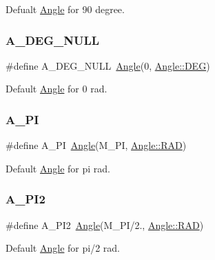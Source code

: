 Defualt \mbox{\hyperlink{class_angle}{Angle}} for 90 degree. 

\mbox{\label{maths_8hh_abc6a1d62385f5e3f01509c97666fbbbb}} 
\subsubsection{\texorpdfstring{A\_DEG\_NULL}{A\_DEG\_NULL}}
{\footnotesize\ttfamily \#define A\+\_\+\+D\+E\+G\+\_\+\+N\+U\+LL~\mbox{\hyperlink{class_angle}{Angle}}(0, \mbox{\hyperlink{class_angle_a4f7b9849ce8780bcba95ca3ee45cff77a65e2aa4bc05730c9c2e8fdaf73612282}{Angle\+::\+D\+EG}})}



Default \mbox{\hyperlink{class_angle}{Angle}} for 0 rad. 

\mbox{\label{maths_8hh_ad37649758ce967343cee82772583fd9c}} 
\subsubsection{\texorpdfstring{A\_PI}{A\_PI}}
{\footnotesize\ttfamily \#define A\+\_\+\+PI~\mbox{\hyperlink{class_angle}{Angle}}(M\+\_\+\+PI, \mbox{\hyperlink{class_angle_a4f7b9849ce8780bcba95ca3ee45cff77a93ab6b68075fd7a6fe724fbde5b13c1f}{Angle\+::\+R\+AD}})}



Default \mbox{\hyperlink{class_angle}{Angle}} for pi rad. 

\mbox{\label{maths_8hh_a73d408ce54489e86b860679af5d24059}} 
\subsubsection{\texorpdfstring{A\_PI2}{A\_PI2}}
{\footnotesize\ttfamily \#define A\+\_\+\+P\+I2~\mbox{\hyperlink{class_angle}{Angle}}(M\+\_\+\+PI/2., \mbox{\hyperlink{class_angle_a4f7b9849ce8780bcba95ca3ee45cff77a93ab6b68075fd7a6fe724fbde5b13c1f}{Angle\+::\+R\+AD}})}



Default \mbox{\hyperlink{class_angle}{Angle}} for pi/2 rad. 

\mbox{\label{maths_8hh_a0da7d22251afe9ccf02289e0bceca28f}} 
